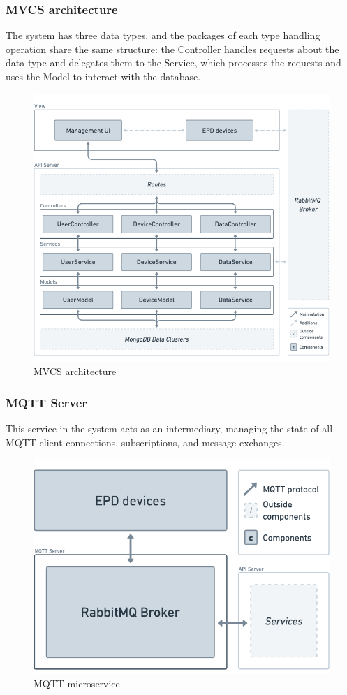 \documentclass[../Main.tex]{subfiles}
\begin{document}
\subsubsection{MVCS architecture}
The system has three data types, and the packages of each type handling operation share the same structure: the Controller handles requests about the data type and delegates them to the Service, which processes the requests and uses the Model to interact with the database.
\begin{figure}[H]
    \centering
    \includegraphics[scale=0.6]{doc/thesis/EN/imgs/api-server.png}
    \caption{MVCS architecture}
    \label{fig:Fig2}
\end{figure}

\subsubsection{MQTT Server}
This service in the system acts as an intermediary, managing the state of all MQTT client connections, subscriptions, and message exchanges.
\begin{figure}[H]
    \centering
    \includegraphics[scale=0.3]{doc/thesis/EN/imgs/mqtt-server.png}
    \caption{MQTT microservice}
    \label{fig:Fig3}
\end{figure}
\end{document}
